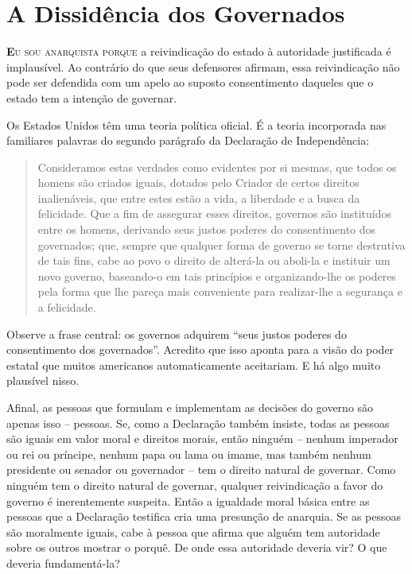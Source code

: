 
\chapter{A Dissidência dos Governados}
\label{chap:1}

\lettrine[lines=2]{\textcolor{LettrineColor}{\textbf{E}}}{u sou anarquista porque} a reivindicação do estado à autoridade justificada é implausível. Ao contrário do que seus defensores afirmam, essa reivindicação não pode ser defendida com um apelo ao suposto consentimento daqueles que o estado tem a intenção de governar.

Os Estados Unidos têm uma teoria política oficial. É a teoria incorporada nas familiares palavras do segundo parágrafo da Declaração de Independência:

\begin{quote}
Consideramos estas verdades como evidentes por si mesmas, que todos os homens são criados iguais, dotados pelo Criador de certos direitos inalienáveis, que entre estes estão a vida, a liberdade e a busca da felicidade. Que a fim de assegurar esses direitos, governos são instituídos entre os homens, derivando seus justos poderes do consentimento dos governados; que, sempre que qualquer forma de governo se torne destrutiva de tais fins, cabe ao povo o direito de alterá-la ou aboli-la e instituir um novo governo, baseando-o em tais princípios e organizando-lhe os poderes pela forma que lhe pareça mais conveniente para realizar-lhe a segurança e a felicidade.
\end{quote}

Observe a frase central: os governos adquirem ``seus justos poderes do consentimento dos governados''. Acredito que isso aponta para a visão do poder estatal que muitos americanos automaticamente aceitariam. E há algo muito plausível nisso.

Afinal, as pessoas que formulam e implementam as decisões do governo são apenas isso -- pessoas. Se, como a Declaração também insiste, todas as pessoas são iguais em valor moral e direitos morais, então ninguém -- nenhum imperador ou rei ou príncipe, nenhum papa ou lama ou imame, mas também nenhum presidente ou senador ou governador -- tem o direito natural de governar. Como ninguém tem o direito natural de governar, qualquer reivindicação a favor do governo é inerentemente suspeita. Então a igualdade moral básica entre as pessoas que a Declaração testifica cria uma presunção de anarquia. Se as pessoas são moralmente iguais, cabe à pessoa que afirma que alguém tem autoridade sobre os outros mostrar o porquê. De onde essa autoridade deveria vir? O que deveria fundamentá-la?

